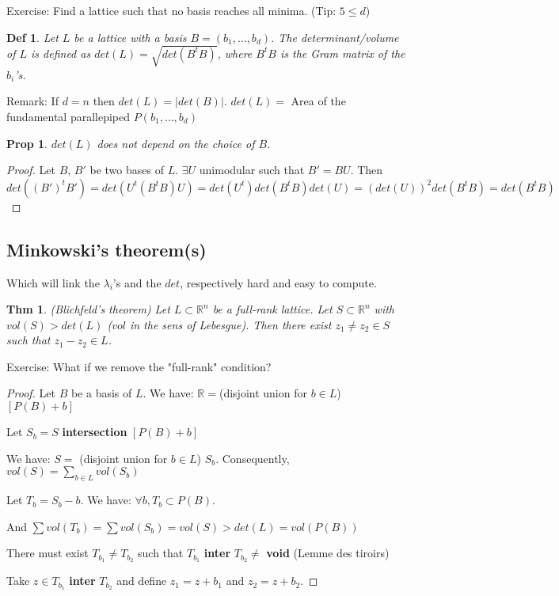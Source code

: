 \documentclass[11pt]{article}
\newtheorem{definition}{Def}
\newtheorem{theorem}{Thm}
\newtheorem{proposition}{Prop}
\begin{document}
Exercise: Find a lattice such that no basis reaches all minima. (Tip: $5 \leq d$)

\begin{definition}
Let $L$ be a lattice with a basis $B=(b_1,...,b_d)$. The determinant/volume of $L$ is defined as $det(L)=\sqrt{det(B^t B)}$, where $B^t B$ is the Gram matrix of the $b_i$'s. 
\end{definition}

Remark: If $d=n$ then $det(L)=|det(B)|$.
$det(L)=$ Area of the fundamental parallepiped $P(b_1,...,b_d)$

\begin{proposition}
$det(L)$ does not depend on the choice of $B$.
\end{proposition}

\begin{proof}
Let $B$, $B'$ be two bases of $L$. $\exists U$ unimodular such that $B'=B U$.
Then $det((B')^t B')=det(U^t (B^t B) U)=det(U^t) det(B^t B) det(U)=(det(U))^2 det(B^t B)=det(B^t B)$
\end{proof}

\subsection{Minkowski's theorem(s)}

Which will link the $\lambda_i$'s and the $det$, respectively hard and easy to compute.

\begin{theorem} (Blichfeld's theorem)
Let $L \subset \mathbb{R}^n$ be a full-rank lattice. Let $S \subset \mathbb{R}^n$ with $vol(S)>det(L)$ ($vol$ in the sens of Lebesgue). Then there exist $z_1 \neq z_2 \in S$ such that $z_1-z_2 \in L$.
\end{theorem}

Exercise: What if we remove the "full-rank" condition?

\begin{proof}
Let $B$ be a basis of $L$.
We have: $\mathbb{R}=$(disjoint union for $b \in L$)$[P(B)+b]$

Let $S_b=S$ \textbf{intersection} $[P(B)+b]$

We have: $S=$ (disjoint union for $b \in L$) $S_b$. Consequently, $vol(S)= \sum_{b \in L} vol(S_b)$

Let $T_b=S_b-b$. We have: $\forall b, T_b \subset P(B)$.

And $\sum vol(T_b)= \sum vol (S_b) = vol(S) > det(L) = vol(P(B))$

There must exist $T_{b_1} \neq T_{b_2}$ such that $T_{b_1}$ \textbf{inter} $T_{b_2} \neq$ \textbf{void} (Lemme des tiroirs)

Take $z \in T_{b_1}$ \textbf{inter} $T_{b_2}$ and define $z_1=z+b_1$ and $z_2=z+b_2$.
\end{proof}
\end{document}
